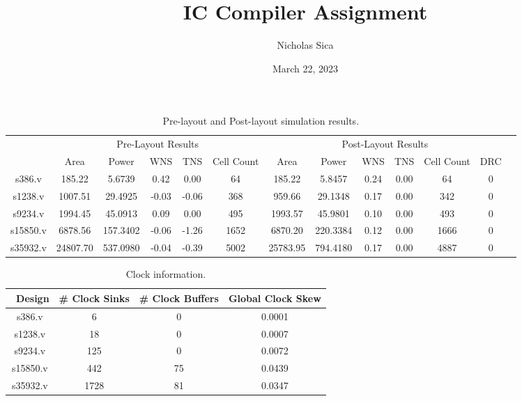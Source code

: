 \documentclass{article}
\title{IC Compiler Assignment}
\author{Nicholas Sica}
\date{March 22, 2023}
\begin{document}
\maketitle

\begin{table}
\centering
\caption{Pre-layout and Post-layout simulation results.}
\begin{tabular}{ |c|c|c|c|c|c|c|c|c|c|c|c|c| }
    \hline \
    \multirow{2}{*}{Design} & \multicolumn{5}{|c|}{Pre-Layout Results} & \multicolumn{6}{|c|}{Post-Layout Results} \\
    \cline{2-12}
    & Area & Power & WNS & TNS & Cell Count & Area & Power & WNS & TNS & Cell Count & DRC \\
    \hline
    s386.v & 185.22 & 5.6739 & 0.42 & 0.00 & 64 & 185.22 & 5.8457 & 0.24 & 0.00 & 64 & 0 \\
    \hline
    s1238.v & 1007.51 & 29.4925 & -0.03 & -0.06 & 368 & 959.66 & 29.1348 & 0.17 & 0.00 & 342 & 0 \\
    \hline
    s9234.v & 1994.45 & 45.0913 & 0.09 & 0.00 & 495 & 1993.57 & 45.9801 & 0.10 & 0.00 & 493 & 0 \\
    \hline
    s15850.v & 6878.56 & 157.3402 & -0.06 & -1.26 & 1652 & 6870.20 & 220.3384 & 0.12 & 0.00 & 1666 & 0 \\
    \hline
    s35932.v & 24807.70 & 537.0980 & -0.04 & -0.39 & 5002 & 25783.95 & 794.4180 & 0.17 & 0.00 & 4887 & 0 \\
    \hline
\end{tabular}
\end{table}

\begin{table}
\centering
\caption{Clock information.}
\begin{tabular}{ |c|c|c|c| }
    \hline \
    Design & \# Clock Sinks & \# Clock Buffers & Global Clock Skew \\
    \hline
    s386.v & 6 & 0 & 0.0001 \\
    s1238.v & 18 & 0 & 0.0007 \\
    s9234.v & 125 & 0 & 0.0072 \\
    s15850.v & 442 & 75 & 0.0439 \\
    s35932.v & 1728 & 81 & 0.0347 \\
\end{tabular}
\end{table}
\end{document}
